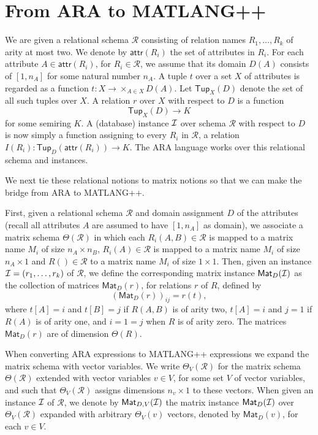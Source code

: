 \newcommand{\cR}{\mathcal{R}}
\newcommand{\Tup}{\mathsf{Tup}}
\newcommand{\attr}[1]{\mathsf{attr}(#1)}
\newcommand{\Matr}{\mathsf{Mat}}
\newtheorem{lemma}{Lemma}
\newtheorem{prop}{Proposition}
\section{From ARA to MATLANG++}
We are given a relational schema $\cR$ consisting of relation names $R_1,\ldots,R_k$ of arity at most two. We denote by $\attr{R_i}$ the set of attributes in $R_i$.
For each attribute $A\in\attr{R_i}$, for $R_i\in\cR$, we assume that its domain $D(A)$ consists of $[1,n_A]$ for some natural number $n_A$. A tuple $t$ over a set $X$ of attributes is regarded as a function
$t:X\to \times_{A\in X} D(A)$. Let $\Tup_X(D)$ denote the set of all such tuples over $X$. A relation $r$ over $X$ with respect to $D$ is a function
$$
\Tup_{X}(D)\to K
$$
for some semiring $K$. A (database) instance $\mathcal{I}$ over schema $\cR$ with respect to $D$ is now simply a function assigning to every $R_i$ in $\cR$, a relation $I(R_i):\Tup_{D}(\attr{R_i})\to K$.
The ARA language works over this relational schema and instances.

We next tie these relational notions to matrix notions so that we can make the bridge from ARA to MATLANG++. 

First, given a relational schema $\cR$ and domain assignment $D$ of the attributes (recall all attributes $A$ are assumed to have $[1,n_A]$ as domain), we associate a matrix schema $\Theta(\cR)$ in which
each $R_i(A,B)\in \cR$ is mapped to a matrix name $M_i$ of size $n_A\times n_B$, $R_i(A)\in \cR$ is mapped to a matrix name $M_i$ of size $n_A\times 1$ and $R()\in\cR$ to a matrix name $M_i$ of size $1\times 1$. Then, given an instance $\mathcal{I}=(r_1,\ldots,r_k)$ of $\cR$, we define the corresponding matrix instance
$\Matr_D(\cI)$ as the collection of matrices $\Matr_D(r)$, for relations $r$ of $R$, defined by
$$
(\Matr_D(r))_{ij}=r(t),
$$
where $t[A]=i$ and $t[B]=j$ if $R(A,B)$ is of arity two, $t[A]=i$ and $j=1$ if $R(A)$ is of arity one,
and $i=1=j$ when $R$ is of arity zero. The matrices $\Matr_D(r)$ are of dimension $\Theta(R)$.


When converting ARA expressions to MATLANG++ expressions we expand the matrix schema with vector variables.  We write $\Theta_V(\cR)$ for the matrix schema $\Theta(\cR)$ extended with vector variables $v\in V$, for some set $V$ of vector variables, and such that $\Theta_V(\cR)$ assigns dimensions $n_v\times 1$ to these vectors. When given an instance $\mathcal{I}$ of $\cR$, 
we denote by  $\Matr_{D,V}(\cI)$ the matrix instance $\Matr_D(\cI)$ over $\Theta_V(\cR)$
 expanded with arbitrary $\Theta_V(v)$ vectors, denoted by $\Matr_{D}(v)$, for each $v\in V$.

